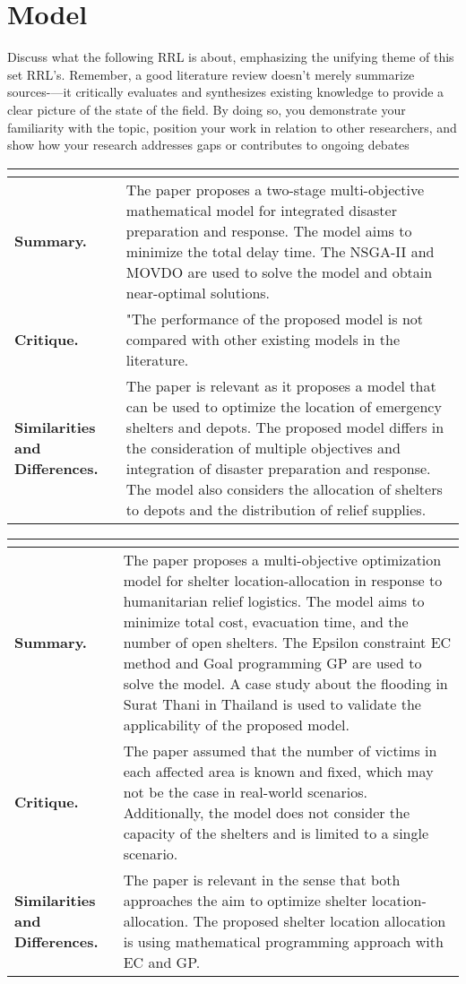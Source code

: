 \section{Model}

Discuss what the following RRL is about, emphasizing the unifying theme of this set RRL's. Remember, a good literature review doesn’t merely summarize sources-—it critically evaluates and synthesizes existing knowledge to provide a clear picture of the state of the field. By doing so, you demonstrate your familiarity with the topic, position your work in relation to other researchers, and show how your research addresses gaps or contributes to ongoing debates

\begin{longtable}{|L{.2\linewidth}|L{.74\linewidth}|}
	\hline
	\\ \hline
	\textbf{Summary.} & The paper proposes a two-stage multi-objective mathematical model for integrated disaster preparation and response. The model aims to minimize the total delay time. The NSGA-II and MOVDO are used to solve the model and obtain near-optimal solutions.\\ \hline
	\textbf{Critique.} & "The performance of the proposed model is not compared with other existing models in the literature.\\ \hline
	\textbf{Similarities and Differences.} & The paper is relevant as it proposes a model that can be used to optimize the location of emergency shelters and depots.	The proposed model differs in the consideration of multiple objectives and integration of disaster preparation and response. The model also considers the allocation of shelters to depots and the distribution of relief supplies.\\ \hline
\end{longtable}

\begin{longtable}{|L{.2\linewidth}|L{.74\linewidth}|}
	\hline
	\\ \hline
	\textbf{Summary.} & The paper proposes a multi-objective optimization model for shelter location-allocation in response to humanitarian relief logistics. The model aims to minimize total cost, evacuation time, and the number of open shelters. The Epsilon constraint EC method and Goal programming GP are used to solve the model. A case study about the flooding in Surat Thani in Thailand is used to validate the applicability of the proposed model.\\ \hline
	\textbf{Critique.} & The paper assumed that the number of victims in each affected area is known and fixed, which may not be the case in real-world scenarios. Additionally, the model does not consider the capacity of  the shelters and is limited to a single scenario.\\ \hline
	\textbf{Similarities and Differences.} & The paper is relevant in the sense that both approaches the aim to optimize shelter location-allocation. 	The proposed shelter location allocation is using mathematical programming approach with EC and GP. \\ \hline
\end{longtable}

